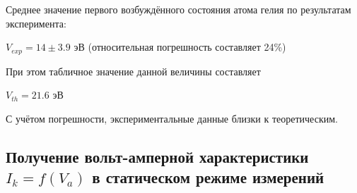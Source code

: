 \documentclass[a4paper]{article}
\begin{document}
\begin{enumerate}
Среднее значение первого возбуждённого состояния атома гелия по результатам эксперимента:
\begin{center}
    $V_{exp} = 14 \pm 3.9$ эВ (относительная погрешность составляет 24\%)
\end{center}
При этом табличное значение данной величины составляет
\begin{center}
    $V_{th} = 21.6$ эВ
\end{center}
С учётом погрешности, экспериментальные данные близки к теоретическим.

\end{enumerate}

\subsection{Получение вольт-амперной характеристики $I_k = f(V_a)$ в статическом режиме измерений}
\end{document}
